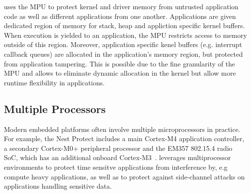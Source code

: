 \name uses the MPU to protect kernel and driver memory from untrusted
application code as well as different applications from one another.
Applications are given dedicated region of memory for stack, heap and appliction
specific kernel buffers. When execution is yielded to an application, the MPU
restricts access to memory outside of this region. Moreover, application
specific kenel buffers (e.g. interrupt callback queues) are allocated in the
application's memory region, but protected from application tampering. This is
possible due to the fine granularity of the MPU and allows \name to eliminate
dynamic allocation in the kernel but allow more runtime flexibility in
applications.

\subsection{Multiple Processors}

Modern embedded platforms often involve multiple microprocessors in practice.
For example, the Nest Protect includes a main Cortex-M4 application controller,
a secondary Cortex-M0+ peripheral processor and the EM357 802.15.4 radio SoC,
which has an additional onboard Cortex-M3~\cite{nestprotect-teardown}. \name
leverages multiprocessor environments to protect time sensitve applications from
interference by, e.g compute heavy applications, as well as to protect against
side-channel attacks on applications handling sensitive data.

